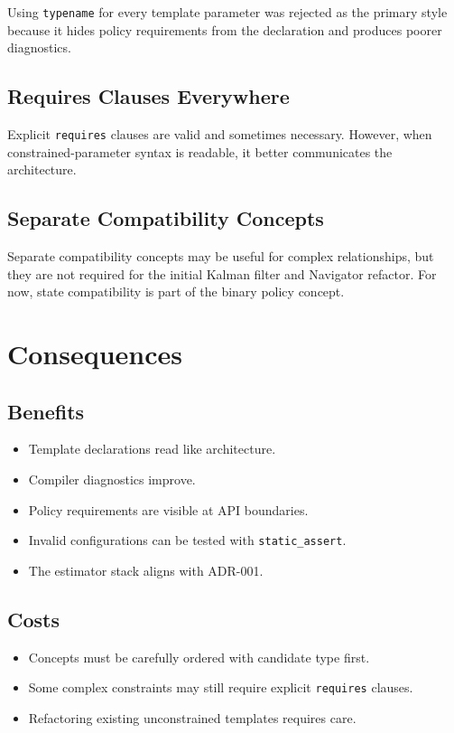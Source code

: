 \documentclass[11pt]{article}
\begin{document}
Using \texttt{typename} for every template parameter was rejected as the
primary style because it hides policy requirements from the declaration and
produces poorer diagnostics.

\subsection{Requires Clauses Everywhere}

Explicit \texttt{requires} clauses are valid and sometimes necessary. However,
when constrained-parameter syntax is readable, it better communicates the
architecture.

\subsection{Separate Compatibility Concepts}

Separate compatibility concepts may be useful for complex relationships, but
they are not required for the initial Kalman filter and Navigator refactor.
For now, state compatibility is part of the binary policy concept.

\section{Consequences}

\subsection{Benefits}

\begin{itemize}
    \item Template declarations read like architecture.
    \item Compiler diagnostics improve.
    \item Policy requirements are visible at API boundaries.
    \item Invalid configurations can be tested with \texttt{static\_assert}.
    \item The estimator stack aligns with ADR-001.
\end{itemize}

\subsection{Costs}

\begin{itemize}
    \item Concepts must be carefully ordered with candidate type first.
    \item Some complex constraints may still require explicit \texttt{requires} clauses.
    \item Refactoring existing unconstrained templates requires care.
\end{itemize}
\end{document}
